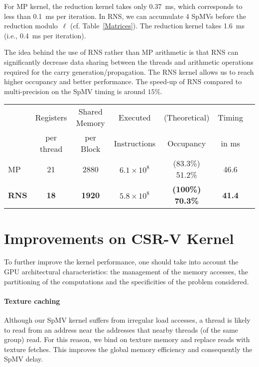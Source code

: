 \documentclass[runningheads,orivec]{llncs}
\begin{document}
For MP kernel, the reduction kernel takes only 0.37~ms, which corresponds to less than 0.1~ms per iteration. In RNS, we can accumulate 4 SpMVs before the reduction modulo~$\ell$ (cf. Table~\ref{Matrices}). The reduction kernel takes 1.6~ms (i.e., 0.4~ms per iteration).   

The idea behind the use of RNS rather than MP arithmetic is that RNS can significantly decrease data sharing between the threads and arithmetic operations required for the carry generation/propagation. The RNS kernel allows us to reach higher occupancy and better performance. The speed-up of RNS compared to multi-precision on the SpMV timing is around $15\%$.

\vspace*{-0.25cm}



\begin{center}
	\begin{tabular}{|l||c|c|c|c|c|c|}
      \hline
        & \footnotesize Registers & \footnotesize Shared Memory & \footnotesize Executed & \footnotesize (Theoretical) & \footnotesize Timing\\
        & \footnotesize per thread & \footnotesize per Block & \footnotesize Instructions & \footnotesize Occupancy & \footnotesize in ms\\  
      \hline
      \hline
      \footnotesize MP & \footnotesize 21 & \footnotesize 2880 & \footnotesize $6.1 \times 10^8$ & \footnotesize (83.3\%) 51.2\% & \footnotesize 46.6\\
      \bf \footnotesize RNS & \bf \footnotesize 18 & \bf \footnotesize 1920 & \bf \footnotesize $5.8 \times 10^{8}$ & \bf \footnotesize (100\%) 70.3\% & \bf \footnotesize 41.4\\
      \hline
    \end{tabular}    
\end{center}

\vspace*{-0.25cm}

\section{Improvements on CSR-V Kernel}
\label{optimizations}
To further improve the kernel performance, one should take into account the GPU architectural characteristics: the management of the memory accesses, the partitioning of the computations and the specificities of the problem considered.
	
\paragraph{\bf Texture caching}
Although our SpMV kernel suffers from irregular load accesses, a thread is likely to read from an address near the addresses that nearby threads (of the same group) read. For this reason, we bind on texture memory and replace reads with texture fetches. This improves the global memory efficiency and consequently the SpMV delay.     
\end{document}

